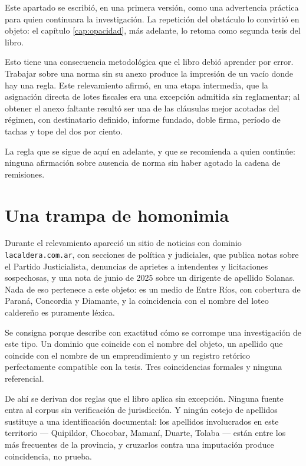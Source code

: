 Este apartado se escribió, en una primera versión, como una advertencia práctica para quien continuara la investigación. La repetición del obstáculo lo convirtió en objeto: el capítulo \ref{cap:opacidad}, más adelante, lo retoma como segunda tesis del libro.

\begin{cautela}
Esto tiene una consecuencia metodológica que el libro debió aprender por error. Trabajar sobre una norma sin su anexo produce la impresión de un vacío donde hay una regla. Este relevamiento afirmó, en una etapa intermedia, que la asignación directa de lotes fiscales era una excepción admitida sin reglamentar; al obtener el anexo faltante resultó ser una de las cláusulas mejor acotadas del régimen, con destinatario definido, informe fundado, doble firma, período de tachas y tope del dos por ciento.

La regla que se sigue de aquí en adelante, y que se recomienda a quien continúe: ninguna afirmación sobre ausencia de norma sin haber agotado la cadena de remisiones.
\end{cautela}

\section{Una trampa de homonimia}

Durante el relevamiento apareció un sitio de noticias con dominio \texttt{lacaldera.com.ar}, con secciones de política y judiciales, que publica notas sobre el Partido Justicialista, denuncias de aprietes a intendentes y licitaciones sospechosas, y una nota de junio de 2025 sobre un dirigente de apellido Solanas. Nada de eso pertenece a este objeto: es un medio de Entre Ríos, con cobertura de Paraná, Concordia y Diamante, y la coincidencia con el nombre del loteo caldereño es puramente léxica.

\begin{cautela}
Se consigna porque describe con exactitud cómo se corrompe una investigación de este tipo. Un dominio que coincide con el nombre del objeto, un apellido que coincide con el nombre de un emprendimiento y un registro retórico perfectamente compatible con la tesis. Tres coincidencias formales y ninguna referencial.

De ahí se derivan dos reglas que el libro aplica sin excepción. Ninguna fuente entra al corpus sin verificación de jurisdicción. Y ningún cotejo de apellidos sustituye a una identificación documental: los apellidos involucrados en este territorio --- Quipildor, Chocobar, Mamaní, Duarte, Tolaba --- están entre los más frecuentes de la provincia, y cruzarlos contra una imputación produce coincidencia, no prueba.
\end{cautela}

